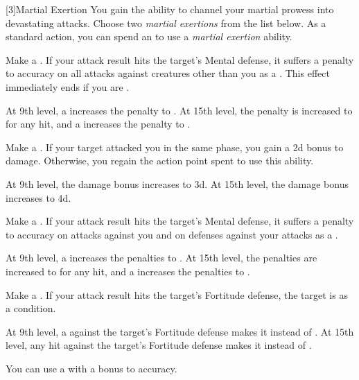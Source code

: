             [3]{Martial Exertion}
            You gain the ability to channel your martial prowess into devastating attacks.
            Choose two \textit{martial exertions} from the list below.
            As a standard action, you can spend an  to use a \textit{martial exertion} ability.
            {
                 Make a .
                If your attack result hits the target's Mental defense, it suffers a  penalty to accuracy on all attacks against creatures other than you as a .
                This effect immediately ends if you are .

                At 9th level, a  increases the penalty to .
                At 15th level, the penalty is increased to  for any hit, and a  increases the penalty to .

                 Make a .
                If your target attacked you in the same phase, you gain a \plus2d bonus to damage.
                Otherwise, you regain the action point spent to use this ability.

                At 9th level, the damage bonus increases to \plus3d.
                At 15th level, the damage bonus increases to \plus4d.

                 Make a .
                If your attack result hits the target's Mental defense, it suffers a  penalty to accuracy on attacks against you and on defenses against your attacks as a .

                At 9th level, a  increases the penalties to .
                At 15th level, the penalties are increased to  for any hit, and a  increases the penalties to .

                 Make a .
                If your attack result hits the target's Fortitude defense, the target is \sickened as a condition.

                At 9th level, a  against the target's Fortitude defense makes it \nauseated instead of \sickened.
                At 15th level, any hit against the target's Fortitude defense makes it \nauseated instead of \sickened.

                 You can use a  with a  bonus to accuracy.

}
